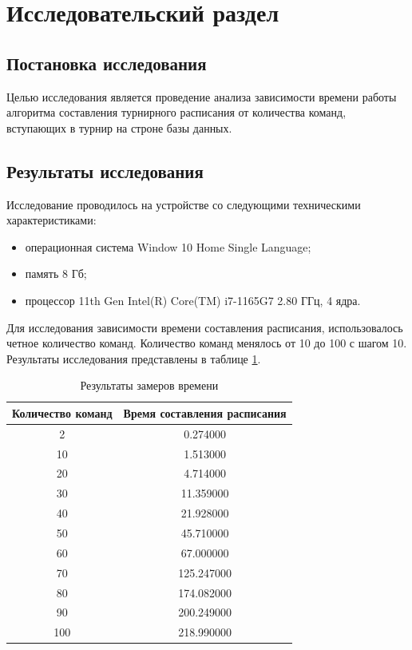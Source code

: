 \section{Исследовательский раздел}

\subsection{Постановка исследования}

Целью исследования является проведение анализа зависимости времени работы алгоритма составления турнирного расписания от количества команд, вступающих в турнир на строне базы данных.

\subsection{Результаты исследования}
Исследование проводилось на устройстве со следующими техническими характеристиками:

\begin{itemize}
	\item операционная система Window 10 Home Single Language;
	\item память 8 Гб;
	\item процессор 11th Gen Intel(R) Core(TM) i7-1165G7 2.80 ГГц, 4 ядра.
\end{itemize}

Для исследования зависимости времени составления расписания, использовалось четное количество команд. Количество команд менялось от 10 до 100 с шагом 10. Результаты исследования представлены в таблице \ref{table:time}.

\begin{table}[H]
	\begin{center}
		\caption{Результаты замеров времени}
		\begin{tabular}{|c|c|}
			\hline
			Количество команд & Время составления расписания \\
			\hline
			2 & 0.274000 \\
			\hline
			10 & 1.513000 \\
			\hline			
			20 & 4.714000 \\
			\hline			
			30 & 11.359000 \\
			\hline			
			40 & 21.928000 \\
			\hline			
			50 & 45.710000 \\
			\hline			
			60 & 67.000000 \\
			\hline			
			70 & 125.247000 \\
			\hline			
			80 & 174.082000 \\
			\hline			
			90 & 200.249000 \\
			\hline			
			100 & 218.990000 \\
			\hline			
		\end{tabular}
		\label{table:time}
	\end{center}
\end{table}

